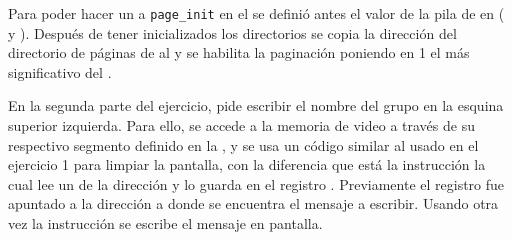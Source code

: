 	Para poder hacer un  a \verb=page_init= en el  se definió antes el valor de la pila de  en 
( y ). Después de tener inicializados los directorios se copia la dirección del directorio de páginas de  al  
y se habilita la paginación poniendo en 1 el  más significativo del . 

    En la segunda parte del ejercicio, pide escribir el nombre del grupo en la esquina superior izquierda. Para ello, se accede a la memoria de video a 
través de su respectivo segmento definido en la , y se usa un código similar al usado en el ejercicio 1 para limpiar la pantalla, con la 
diferencia que está la instrucción  la cual lee un  de la dirección  y lo guarda en el registro . Previamente 
el registro  fue apuntado a la dirección a donde se encuentra el mensaje a escribir. Usando otra vez la instrucción  se escribe el 
mensaje en pantalla.

